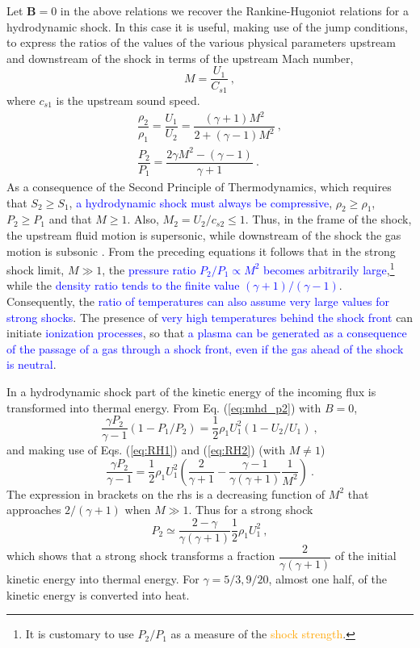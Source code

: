 \documentclass[12pt,a4paper]{article}
\renewcommand{\vec}[1]{\boldsymbol{#1}}
\begin{document}
Let $\vec{B} = 0$ in the above relations we recover the Rankine-Hugoniot relations for a hydrodynamic shock. In this case it is useful, making use of the jump conditions, to express the ratios of the values of the various physical parameters upstream and
downstream of the shock in terms of the upstream Mach number,
\begin{equation}
M = \dfrac{U_1}{C_{s1}} ~,
\end{equation}
where $c_{s1}$ is the upstream sound speed.
\begin{align}
\dfrac{\rho_2}{\rho_{1}} = \dfrac{U_1}{U_{2}} = \dfrac{(\gamma +1) M^2}{2+(\gamma -1)M^2} ~, \label{eq:RH1} \\
\dfrac{P_2}{P_{1}} = \dfrac{2\gamma M^2 -(\gamma -1)}{\gamma +1} ~. \label{eq:RH2}
\end{align}
As a consequence of the Second Principle of Thermodynamics, which requires that $S_2 \geqslant S_1$, \textcolor{blue}{a hydrodynamic shock must always be compressive}, $\rho_2 \geqslant \rho_1$, $P_2 \geqslant P_1$ and that $M \geqslant 1$. Also, $M_2 = U_2/c_{s2} \leqslant 1$. Thus, in the frame of the shock, the upstream fluid motion is supersonic, while downstream of the shock the gas motion is subsonic . From the preceding equations it follows that in the strong shock limit, $M \gg 1$, the \textcolor{blue}{pressure ratio $P_2/P_1 \propto M^2$ becomes arbitrarily large},\footnote{It is customary to use $P_2/P_1$ as a measure of the \textcolor{orange}{shock strength}.} while the \textcolor{blue}{density ratio tends to the finite value $(\gamma + 1)/(\gamma - 1)$}. Consequently, the \textcolor{blue}{ratio of temperatures can also assume very large values for strong shocks}. The presence of \textcolor{blue}{very high temperatures behind the shock front} can initiate \textcolor{blue}{ionization processes}, so that \textcolor{blue}{a plasma can be generated as a consequence of the passage of a gas through a shock front, even if the gas ahead of the shock is neutral}.

In a hydrodynamic shock part of the kinetic energy of the incoming flux is transformed into thermal energy. From Eq. (\ref{eq:mhd_p2}) with $B = 0$,
\begin{equation}
\dfrac{\gamma P_2}{\gamma -1} (1-P_1/P_2) = \dfrac{1}{2} \rho_1 U_1^2 (1-U_2/U_1) ~,
\end{equation}
and making use of Eqs. (\ref{eq:RH1}) and (\ref{eq:RH2}) (with $M \neq 1$)
\begin{equation}
\dfrac{\gamma P_2}{\gamma -1} = \dfrac{1}{2} \rho_1 U_1^2 \left(\dfrac{2}{\gamma +1} - \dfrac{\gamma -1}{\gamma(\gamma +1)} \dfrac{1}{M^2} \right) ~.
\end{equation}
The expression in brackets on the rhs is a decreasing function of $M^2$ that approaches $2/(\gamma + 1)$ when $M \gg 1$. Thus for a strong shock
\begin{equation}
P_2 \simeq \dfrac{2-\gamma}{\gamma(\gamma+1)} \dfrac{1}{2} \rho_1 U_1^2 ~,
\end{equation}
which shows that a strong shock transforms a fraction $\dfrac{2}{\gamma(\gamma +1)}$ of the initial kinetic energy into thermal energy. For $\gamma = 5/3, 9/20$, almost one half, of the kinetic energy is converted into heat.
\end{document}
